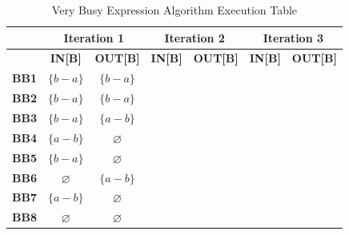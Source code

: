 \documentclass{article}
\begin{document}
\begin{table}[H]
	\centering
	\begin{tabular}{|c|c|c|c|c|c|c|}
		\hline
		             & \multicolumn{2}{c|}{\textbf{Iteration 1}} & \multicolumn{2}{c|}{\textbf{Iteration 2}} & \multicolumn{2}{c|}{\textbf{Iteration 3}}                                                      \\ \hline
		             & \textbf{IN[B]}                            & \textbf{OUT[B]}                           & \textbf{IN[B]}                            & \textbf{OUT[B]} & \textbf{IN[B]} & \textbf{OUT[B]} \\ \hline
		\textbf{BB1} & $\{b-a\}$                                 & $\{b-a\}$                                 &                                           &                 &                &                 \\ \hline
		\textbf{BB2} & $\{b-a\}$                                 & $\{b-a\}$                                 &                                           &                 &                &                 \\ \hline
		\textbf{BB3} & $\{b-a\}$                                 & $\{a-b\}$                                 &                                           &                 &                &                 \\ \hline
		\textbf{BB4} & $\{a-b\}$                                 & $\varnothing$                             &                                           &                 &                &                 \\ \hline
		\textbf{BB5} & $\{b - a\}$                               & $\varnothing$                             &                                           &                 &                &                 \\ \hline
		\textbf{BB6} & $\varnothing$                             & $\{a-b\}$                                 &                                           &                 &                &                 \\ \hline
		\textbf{BB7} & $\{a-b\}$                                 & $\varnothing$                             &                                           &                 &                &                 \\ \hline
		\textbf{BB8} & $\varnothing$                             & $\varnothing$                             &                                           &                 &                &                 \\ \hline
	\end{tabular}
	\caption{Very Busy Expression Algorithm Execution Table}
\end{table}
\end{document}
